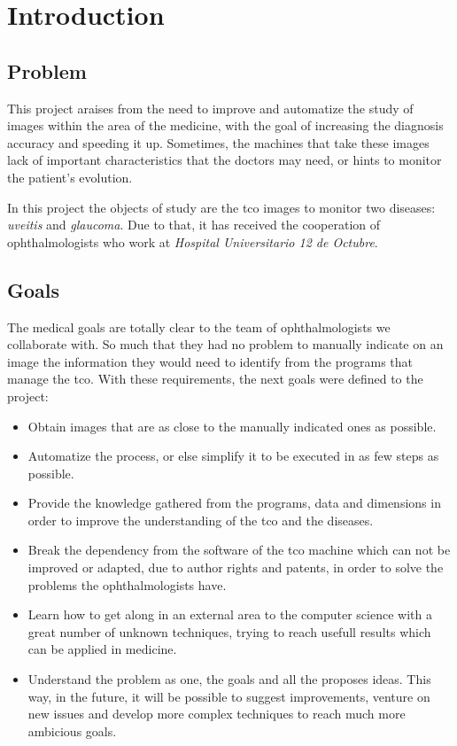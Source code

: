 \chapter{Introduction}
\section{Problem}
This project araises from the need to improve and automatize the
study of images within the area of the medicine, with the goal of 
increasing the diagnosis accuracy and speeding it up. Sometimes, the
machines that take these images lack of important characteristics 
that the doctors may need, or hints to monitor the patient's evolution.

In this project the objects of study are the \gls{tco} images to monitor
two diseases: \emph{\gls{uveitis}} and \emph{\gls{glaucoma}}. Due to that,
it has received the cooperation of ophthalmologists who work at
\emph{Hospital Universitario 12 de Octubre}.

\section{Goals}
The medical goals are totally clear to the team of ophthalmologists
we collaborate with. So much that they had no problem to manually indicate on an 
image the information they would need to identify from the programs that 
manage the \gls{tco}. With these requirements, the next goals were defined 
to the project:
\begin{itemize}
\item Obtain images that are as close to the manually indicated ones as possible.
\item Automatize the process, or else simplify it to be executed in as few steps as possible.
\item Provide the knowledge gathered from the programs, data and 
dimensions in order to improve the understanding of the \gls{tco} and
the diseases.
\item Break the dependency from the software of the \gls{tco} machine
which can not be improved or adapted, due to author rights and patents, 
in order to solve the problems the ophthalmologists have.
\item Learn how to get along in an external area to the computer science
with a great number of unknown techniques, trying to reach usefull 
results which can be applied in medicine.
\item Understand the problem as one, the goals and all the proposes ideas.
This way, in the future, it will be possible to suggest improvements, venture
on new issues and develop more complex techniques to reach much more
ambicious goals.
\end{itemize}

